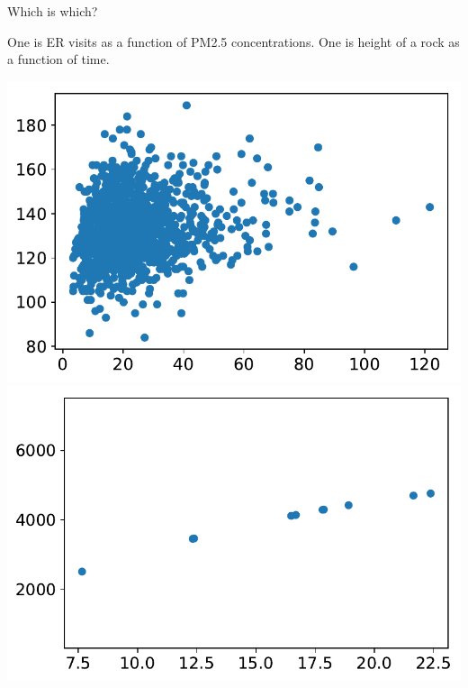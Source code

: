 \documentclass[aspectratio=169, handout]{beamer}
\begin{document}
\begin{frame}{Which is which?}

One is ER visits as a function of PM2.5 concentrations.  One is height of a rock as a function of time.

\vspace{5mm}

\includegraphics[scale=0.475]{data/Huang_et_al/huang_pm25vcirc_notitle.pdf}\vspace{10mm}\hspace{8mm}\includegraphics[scale=0.475]{data/Huang_et_al/projectile_notitle.pdf}

\end{frame}
\end{document}
